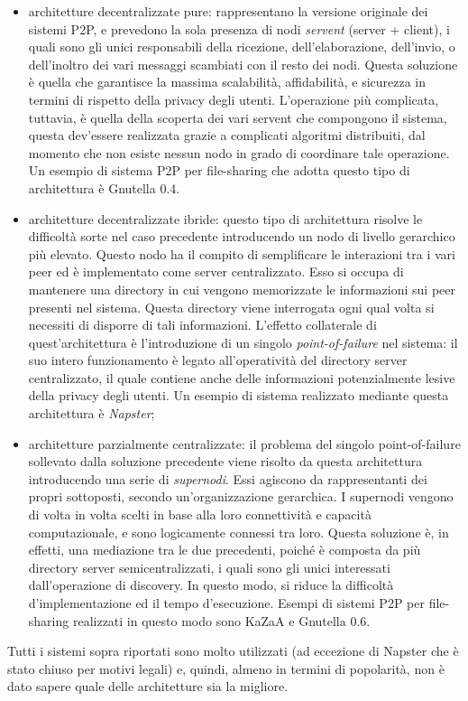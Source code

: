 \begin{itemize}
\item architetture decentralizzate pure: rappresentano la versione originale dei sistemi P2P, e prevedono la sola presenza di nodi \textit{servent} (server + client), i quali sono gli unici responsabili della ricezione, dell’elaborazione, dell’invio, o dell’inoltro dei vari messaggi scambiati con il resto dei nodi. Questa soluzione è quella che garantisce la massima scalabilità, affidabilità, e sicurezza in termini di rispetto della privacy degli utenti. L’operazione più complicata, tuttavia, è quella della scoperta dei vari servent che compongono il sistema, questa dev'essere realizzata grazie a complicati algoritmi distribuiti, dal momento che non esiste nessun nodo in grado di coordinare tale operazione. Un esempio di sistema P2P per file-sharing che adotta questo tipo di architettura è Gnutella 0.4.
\item architetture decentralizzate ibride: questo tipo di architettura risolve le difficoltà sorte nel caso precedente introducendo un nodo di livello gerarchico più elevato. Questo nodo ha il compito di semplificare le interazioni tra i vari peer ed è implementato come server centralizzato. Esso si occupa di mantenere una directory in cui vengono memorizzate le informazioni sui peer presenti nel sistema. Questa directory viene interrogata ogni qual volta si necessiti di disporre di tali informazioni. L’effetto collaterale di quest'architettura è l’introduzione di un singolo 
\textit{point-of-failure} nel sistema: il suo intero funzionamento è legato all’operatività del directory server centralizzato, il quale contiene anche delle informazioni potenzialmente lesive della privacy degli utenti. Un esempio di sistema realizzato mediante questa architettura è \textit{Napster};
\item architetture parzialmente centralizzate: il problema del singolo point-of-failure sollevato dalla soluzione precedente viene risolto da questa architettura introducendo una serie di \textit{supernodi}. Essi agiscono da rappresentanti dei propri sottoposti, secondo un’organizzazione gerarchica. I supernodi vengono di volta in volta scelti in base alla loro connettività e capacità computazionale, e sono logicamente connessi tra loro. Questa soluzione è, in effetti, una mediazione tra le due precedenti, poiché è composta da più directory server semicentralizzati, i quali sono gli unici interessati dall’operazione di discovery. In questo modo, si riduce la difficoltà d'implementazione ed il tempo d'esecuzione. Esempi di sistemi P2P per file-sharing realizzati in questo modo sono KaZaA e Gnutella 0.6.
\end{itemize}
Tutti i sistemi sopra riportati sono molto utilizzati (ad eccezione di Napster che è stato chiuso per motivi legali) e, quindi, almeno in termini di popolarità, non è dato sapere quale delle architetture sia la migliore.

